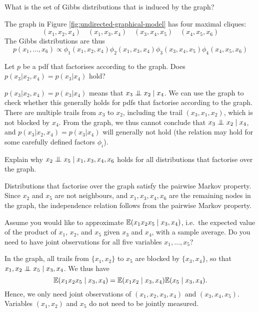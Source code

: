 \begin{exenumerate}

  
\item What is the set of Gibbs distributions that is induced by the graph?

  \begin{solution}
  The graph in Figure \ref{fig:undirected-graphical-model} has four maximal cliques:
  $$(x_1,x_2,x_4) \quad (x_1,x_3,x_4) \quad (x_3,x_4,x_5) \quad (x_4, x_5, x_6)$$
  The Gibbs distributions are thus
  $$p(x_1,\ldots,x_6) \propto \phi_1(x_1,x_2,x_4) \phi_2(x_1,x_3,x_4) \phi_3(x_3,x_4,x_5) \phi_4(x_4, x_5, x_6)$$
\end{solution}

\item Let $p$ be a pdf that factorises according to the graph. Does $p(x_3 | x_2, x_4) = p(x_3 | x_4)$ hold?

  \begin{solution}
    $p(x_3 | x_2, x_4) = p(x_3 | x_4)$ means that $x_3 \mathrel{\perp\mspace{-10mu}\perp}
    x_2 \mid x_4$. We can use the graph to check whether this
    generally holds for pdfs that factorise according to the
    graph. There are multiple trails from $x_3$ to $x_2$, including
    the trail $(x_3,x_1,x_2)$, which is not blocked by $x_4$. From the
    graph, we thus cannot conclude that $x_3 \mathrel{\perp\mspace{-10mu}\perp} x_2 \mid x_4$,
    and $p(x_3 | x_2, x_4) = p(x_3 | x_4)$ will generally not hold
    (the relation may hold for some carefully defined factors $\phi_i$).
    
  \end{solution}

\item Explain why $x_2 \mathrel{\perp\mspace{-10mu}\perp} x_5 \mid x_1,x_3,x_4,x_6$ holds for all distributions that factorise over the graph.

  \begin{solution}
    Distributions that factorise over the graph satisfy the pairwise Markov property. Since $x_2$ and $x_5$ are not neighbours, and $x_1,x_3,x_4,x_6$
    are the remaining nodes in the graph, the independence relation follows from the pairwise Markov property.    
  \end{solution}
  
\item Assume you would like to approximate $\mathbb{E} (x_1 x_2 x_5 \mid
  x_3,x_4)$, i.e.\ the expected value of the product of $x_1$, $x_2$,
  and $x_5$ given $x_3$ and $x_4$, with a sample average. Do you
  need to have joint observations for all five variables $x_1, \ldots, x_5$?
  
  \begin{solution}

    In the graph, all trails from $\{x_1,x_2\}$ to $x_5$ are blocked by $\{x_3,x_4\}$, so that $x_1, x_2 \mathrel{\perp\mspace{-10mu}\perp} x_5 \mid x_3, x_4$. We thus have
    $$\mathbb{E} (x_1 x_2 x_5 \mid x_3,x_4) =  \mathbb{E} (x_1 x_2 \mid x_3,x_4)  \mathbb{E} (x_5 \mid x_3,x_4).$$
    Hence, we only need joint observations of $(x_1, x_2, x_3, x_4)$ and $(x_3, x_4,x_5)$. Variables $(x_1,x_2)$ and $x_5$ do not need to be jointly measured.

  \end{solution}
  
\end{exenumerate}


